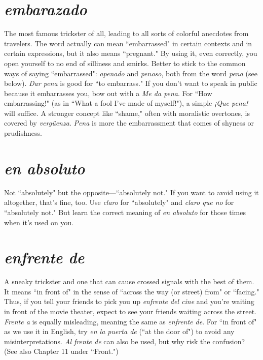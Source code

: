 \section{\emph{embarazado}}

The most famous trickster of all, leading to
all sorts of colorful anecdotes from travelers. The word actually can
mean ``embarrassed" in certain contexts and in certain expressions,
but it also means ``pregnant." By using it, even correctly, you open
yourself to no end of silliness and smirks. Better to stick to the common ways of saying ``embarrassed": \emph{apenado} and \emph{penoso}, both from
the word \emph{pena} (see below). \emph{Dar pena} is good for ``to embarrass." If you
don't want to speak in public because it embarrasses you, bow out with
a \emph{Me da pena}. For ``How embarrassing!" (as in ``What a fool I've made
of myself!"), a simple \emph{¡Que pena!} will suffice. A stronger concept like
``shame," often with moralistic overtones, is covered by \emph{vergüenza}.
\emph{Pena} is more the embarrassment that comes of shyness or prudishness.

\section{\emph{en absoluto}}

Not ``absolutely" but the opposite---``absolutely not." If you want to avoid using it altogether, that's fine, too.
Use \emph{claro} for ``absolutely" and \emph{claro que no} for ``absolutely not." But
learn the correct meaning of \emph{en absoluto} for those times when it's
used on you.

\section{\emph{enfrente de}}

A sneaky trickster and one that can cause
crossed signals with the best of them. It means ``in front of" in the
sense of ``across the way (or street) from" or ``facing." Thus, if you tell
your friends to pick you up \emph{enfrente del cine} and you're waiting in
front of the movie theater, expect to see your friends waiting across
the street. \emph{Frente a} is equally misleading, meaning the same as \emph{enfrente de}. For ``in front of" as we use it in English, try \emph{en la puerta de}
(``at the door of") to avoid any misinterpretations. \emph{Al frente de} can also
be used, but why risk the confusion? (See also Chapter 11 under
``Front.")

